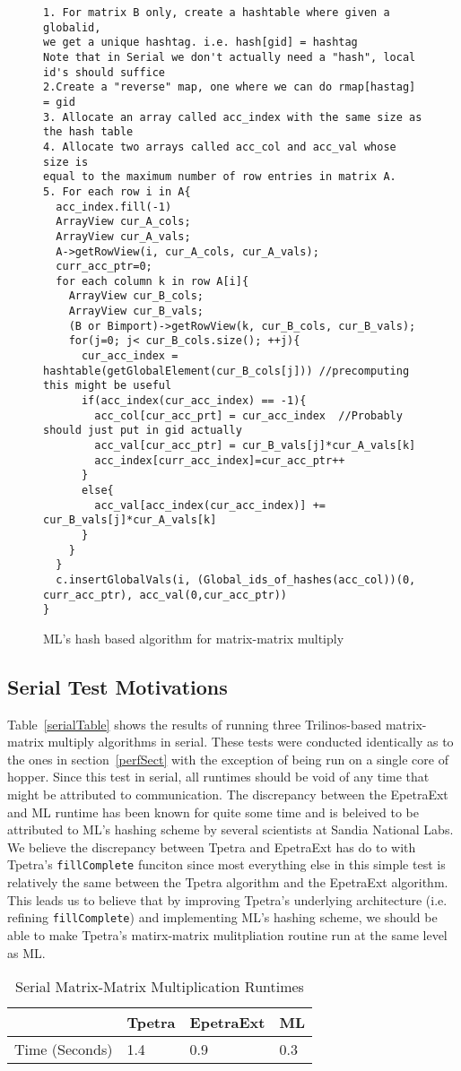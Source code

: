 \documentclass{article}
\begin{document}
\begin{figure}
\centering
{\footnotesize
\begin{verbatim}
1. For matrix B only, create a hashtable where given a globalid, 
we get a unique hashtag. i.e. hash[gid] = hashtag
Note that in Serial we don't actually need a "hash", local id's should suffice
2.Create a "reverse" map, one where we can do rmap[hastag] = gid
3. Allocate an array called acc_index with the same size as the hash table
4. Allocate two arrays called acc_col and acc_val whose size is 
equal to the maximum number of row entries in matrix A.
5. For each row i in A{
  acc_index.fill(-1)
  ArrayView cur_A_cols;
  ArrayView cur_A_vals;
  A->getRowView(i, cur_A_cols, cur_A_vals);
  curr_acc_ptr=0;
  for each column k in row A[i]{
    ArrayView cur_B_cols;
    ArrayView cur_B_vals;
    (B or Bimport)->getRowView(k, cur_B_cols, cur_B_vals);
    for(j=0; j< cur_B_cols.size(); ++j){
      cur_acc_index = hashtable(getGlobalElement(cur_B_cols[j])) //precomputing this might be useful
      if(acc_index(cur_acc_index) == -1){
        acc_col[cur_acc_prt] = cur_acc_index  //Probably should just put in gid actually
        acc_val[cur_acc_ptr] = cur_B_vals[j]*cur_A_vals[k]
        acc_index[curr_acc_index]=cur_acc_ptr++
      }
      else{
        acc_val[acc_index(cur_acc_index)] += cur_B_vals[j]*cur_A_vals[k]
      }
    }
  }
  c.insertGlobalVals(i, (Global_ids_of_hashes(acc_col))(0, curr_acc_ptr), acc_val(0,cur_acc_ptr))
}

\end{verbatim}
}
\caption[Hash based algorithm]{ML's hash based algorithm for matrix-matrix multiply}
\label{hashalgo}
\end{figure}

\subsection{Serial Test Motivations}
Table~\ref{serialTable} shows the results of running three Trilinos-based matrix-matrix multiply algorithms in 
serial. These tests were conducted identically as to the ones in section~\ref{perfSect} with the exception of being run on a single core of 
hopper. Since this test in serial, all runtimes should be void of any time that might be attributed to communication.
The discrepancy between the EpetraExt and ML runtime has been known for quite some time and is beleived to be
attributed to ML's hashing scheme by several scientists at Sandia National Labs. We believe the discrepancy between 
Tpetra and EpetraExt has do to with Tpetra's \verb!fillComplete! funciton since most everything else in this simple test 
is relatively the same between the Tpetra algorithm and the EpetraExt algorithm. This leads us to believe that
by improving Tpetra's underlying architecture (i.e. refining \verb!fillComplete!) and implementing ML's hashing
scheme, we should be able to make Tpetra's matirx-matrix mulitpliation routine run at the same level as ML.

\begin{table}
\begin{tabular}{ | l | l | l | l | }
\hline
 & Tpetra & EpetraExt & ML \\ \hline
Time (Seconds) & 1.4 & 0.9 & 0.3 \\ \hline
\end{tabular}
\caption{Serial Matrix-Matrix Multiplication Runtimes}
\label{serailTable}
\end{table}
\end{document}
